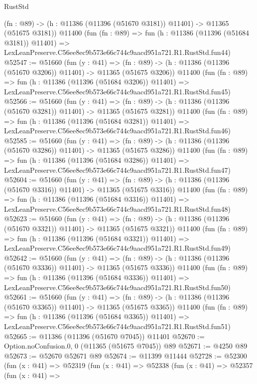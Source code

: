 \begin{lexlean}{RustStd}
\begin{coremodule}
    (fn : @89) -> (h : @11386 (@11396 (@51670 @3181)) @11401) -> @11365 (@51675 @3181))
    @11400
    (fun (fn : @89) =>
    fun (h : @11386 (@11396 (@51684 @3181)) @11401) =>
    LexLeanPreserve.C56ee8ec9b573e66c744c9aacd951a721.R1.RustStd.fun44)
@52547 := @51660
    (fun (y : @41) =>
    (fn : @89) -> (h : @11386 (@11396 (@51670 @3206)) @11401) -> @11365 (@51675 @3206))
    @11400
    (fun (fn : @89) =>
    fun (h : @11386 (@11396 (@51684 @3206)) @11401) =>
    LexLeanPreserve.C56ee8ec9b573e66c744c9aacd951a721.R1.RustStd.fun45)
@52566 := @51660
    (fun (y : @41) =>
    (fn : @89) -> (h : @11386 (@11396 (@51670 @3281)) @11401) -> @11365 (@51675 @3281))
    @11400
    (fun (fn : @89) =>
    fun (h : @11386 (@11396 (@51684 @3281)) @11401) =>
    LexLeanPreserve.C56ee8ec9b573e66c744c9aacd951a721.R1.RustStd.fun46)
@52585 := @51660
    (fun (y : @41) =>
    (fn : @89) -> (h : @11386 (@11396 (@51670 @3286)) @11401) -> @11365 (@51675 @3286))
    @11400
    (fun (fn : @89) =>
    fun (h : @11386 (@11396 (@51684 @3286)) @11401) =>
    LexLeanPreserve.C56ee8ec9b573e66c744c9aacd951a721.R1.RustStd.fun47)
@52604 := @51660
    (fun (y : @41) =>
    (fn : @89) -> (h : @11386 (@11396 (@51670 @3316)) @11401) -> @11365 (@51675 @3316))
    @11400
    (fun (fn : @89) =>
    fun (h : @11386 (@11396 (@51684 @3316)) @11401) =>
    LexLeanPreserve.C56ee8ec9b573e66c744c9aacd951a721.R1.RustStd.fun48)
@52623 := @51660
    (fun (y : @41) =>
    (fn : @89) -> (h : @11386 (@11396 (@51670 @3321)) @11401) -> @11365 (@51675 @3321))
    @11400
    (fun (fn : @89) =>
    fun (h : @11386 (@11396 (@51684 @3321)) @11401) =>
    LexLeanPreserve.C56ee8ec9b573e66c744c9aacd951a721.R1.RustStd.fun49)
@52642 := @51660
    (fun (y : @41) =>
    (fn : @89) -> (h : @11386 (@11396 (@51670 @3336)) @11401) -> @11365 (@51675 @3336))
    @11400
    (fun (fn : @89) =>
    fun (h : @11386 (@11396 (@51684 @3336)) @11401) =>
    LexLeanPreserve.C56ee8ec9b573e66c744c9aacd951a721.R1.RustStd.fun50)
@52661 := @51660
    (fun (y : @41) =>
    (fn : @89) -> (h : @11386 (@11396 (@51670 @3365)) @11401) -> @11365 (@51675 @3365))
    @11400
    (fun (fn : @89) =>
    fun (h : @11386 (@11396 (@51684 @3365)) @11401) =>
    LexLeanPreserve.C56ee8ec9b573e66c744c9aacd951a721.R1.RustStd.fun51)
@52665 := @11386 (@11396 (@51670 @7045)) @11401
@52670 := Option.noConfusion.{0, 0} (@11365 (@51675 @7045)) @89
@52671 := @4250 @89
@52673 := @52670 @52671 @89
@52674 := @11399 @11444
@52728 := @52300
    (fun (x : @41) =>
    @52319
      (fun (x : @41) =>
      @52338
        (fun (x : @41) =>
        @52357
          (fun (x : @41) =>

\end{coremodule}
\end{lexlean}
